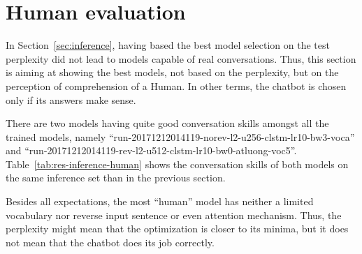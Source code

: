 \section{Human evaluation}
In Section~\ref{sec:inference}, having based the best model selection on the test perplexity did not lead to models capable of real conversations. Thus, this section is aiming at showing the best models, not based on the perplexity, but on the perception of comprehension of a Human. In other terms, the chatbot is chosen only if its answers make sense.

There are two models having quite good conversation skills amongst all the trained models, namely ``run-20171212014119-norev-l2-u256-clstm-lr10-bw3-voca'' and ``run-20171212014119-rev-l2-u512-clstm-lr10-bw0-atluong-voc5''. Table~\ref{tab:res-inference-human} shows the conversation skills of both models on the same inference set than in the previous section.

Besides all expectations, the most ``human'' model has neither a limited vocabulary nor reverse input sentence or even attention mechanism. Thus, the perplexity might mean that the optimization is closer to its minima, but it does not mean that the chatbot does its job correctly.

